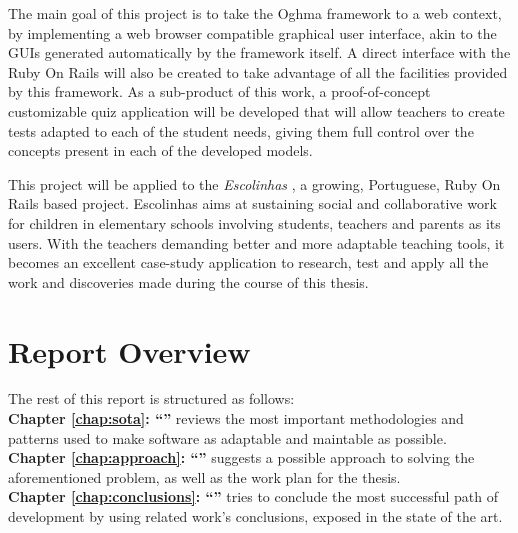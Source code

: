 The main goal of this project is to take the Oghma framework \cite{FCA09} to a web context, by implementing a web browser compatible graphical user interface, akin to the GUIs generated automatically by the framework itself. A direct interface with the Ruby On Rails will also be created to take advantage of all the facilities provided by this framework. As a sub-product of this work, a proof-of-concept customizable quiz application will be developed that will allow teachers to create tests adapted to each of the student needs, giving them full control over the concepts present in each of the developed models.

This project will be applied to the \textit{Escolinhas} \cite{escolinhas}, a growing, Portuguese, Ruby On Rails based project. Escolinhas aims at sustaining social and collaborative work for children in elementary schools involving students, teachers and parents as its users. With the teachers demanding better and more adaptable teaching tools, it becomes an excellent case-study application to research, test and apply all the work and discoveries made during the course of this thesis.

\section{Report Overview}\label{sec:structure}

The rest of this report is structured as follows:\\

\textbf{Chapter \ref{chap:sota}: ``'' } reviews the most important methodologies and patterns used to make software as adaptable and maintable as possible.\\

\textbf{Chapter \ref{chap:approach}: ``'' } suggests a possible approach to solving the aforementioned problem, as well as the work plan for the thesis.\\

\textbf{Chapter \ref{chap:conclusions}: ``'' } tries to conclude the most successful path of development by using related work’s conclusions, exposed in the state of the art. %

